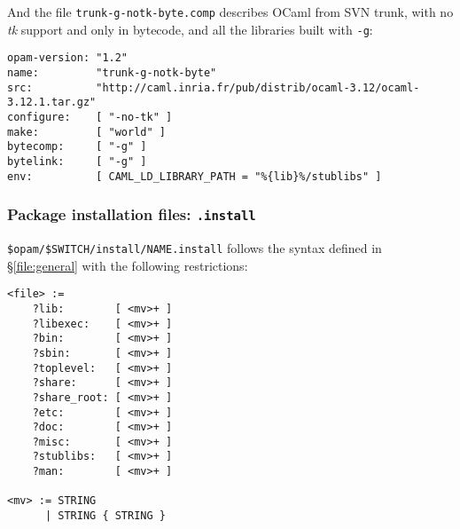 \documentclass[a4paper,10pt]{article}
\begin{document}
And the file {\tt trunk-g-notk-byte.comp} describes OCaml from SVN
trunk, with no {\em tk} support and only in bytecode, and all the
libraries built with {\tt -g}:

\begin{verbatim}
opam-version: "1.2"
name:         "trunk-g-notk-byte"
src:          "http://caml.inria.fr/pub/distrib/ocaml-3.12/ocaml-3.12.1.tar.gz"
configure:    [ "-no-tk" ]
make:         [ "world" ]
bytecomp:     [ "-g" ]
bytelink:     [ "-g" ]
env:          [ CAML_LD_LIBRARY_PATH = "%{lib}%/stublibs" ]
\end{verbatim}


\subsubsection{Package installation files: {\tt *.install}}
\label{file:install}

\verb+$opam/$SWITCH/install/NAME.install+ follows the syntax defined
in \S\ref{file:general} with the following restrictions:

\begin{Verbatim}
<file> :=
    ?lib:        [ <mv>+ ]
    ?libexec:    [ <mv>+ ]
    ?bin:        [ <mv>+ ]
    ?sbin:       [ <mv>+ ]
    ?toplevel:   [ <mv>+ ]
    ?share:      [ <mv>+ ]
    ?share_root: [ <mv>+ ]
    ?etc:        [ <mv>+ ]
    ?doc:        [ <mv>+ ]
    ?misc:       [ <mv>+ ]
    ?stublibs:   [ <mv>+ ]
    ?man:        [ <mv>+ ]

<mv> := STRING
      | STRING { STRING }
\end{Verbatim}
\end{document}
